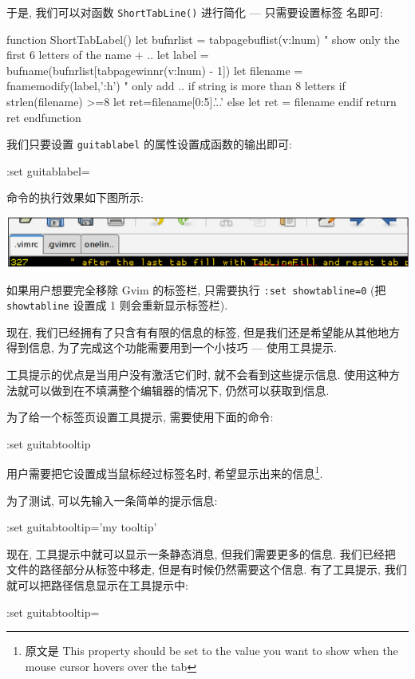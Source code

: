 于是, 我们可以对函数 \texttt{ShortTabLine()} 进行简化 --- 只需要设置标签
名即可:
\begin{vimscript}
function ShortTabLabel()
 let bufnrlist = tabpagebuflist(v:lnum)
 " show only the first 6 letters of the name + ..
 let label = bufname(bufnrlist[tabpagewinnr(v:lnum) - 1])
 let filename = fnamemodify(label,':h')
 " only add .. if string is more than 8 letters
  if strlen(filename) >=8
     let ret=filename[0:5].'..'
  else
    let ret = filename
 endif
     return ret
 endfunction
\end{vimscript}
我们只要设置 \texttt{guitablabel} 的属性设置成函数的输出即可:
\begin{vimcmd}
:set guitablabel=%
\end{vimcmd}
命令的执行效果如下图所示:
\begin{center}
\includegraphics[scale=0.8]{./images/page36}
\end{center}

\begin{warning}
如果用户想要完全移除 Gvim 的标签栏, 只需要执行 \texttt{:set showtabline=0}
(把 \texttt{showtabline} 设置成 1 则会重新显示标签栏).
\end{warning}

现在, 我们已经拥有了只含有有限的信息的标签, 但是我们还是希望能从其他地方
得到信息, 为了完成这个功能需要用到一个小技巧 --- 使用工具提示.

工具提示的优点是当用户没有激活它们时,
就不会看到这些提示信息. 使用这种方法就可以做到在不填满整个编辑器的情况下, 
仍然可以获取到信息.

为了给一个标签页设置工具提示, 需要使用下面的命令:
\begin{vimcmd}
:set guitabtooltip
\end{vimcmd}
用户需要把它设置成当鼠标经过标签名时, 希望显示出来的信息\footnote{原文是
 This property should be set to the value you want to show when the mouse
 cursor hovers over the tab}.

为了测试, 可以先输入一条简单的提示信息:
\begin{vimcmd}
:set guitabtooltip='my tooltip'
\end{vimcmd}
现在, 工具提示中就可以显示一条静态消息, 但我们需要更多的信息. 我们已经把
文件的路径部分从标签中移走, 但是有时候仍然需要这个信息. 有了工具提示, 我们 
就可以把路径信息显示在工具提示中:
\begin{vimcmd}
:set guitabtooltip=%
\end{vimcmd}

